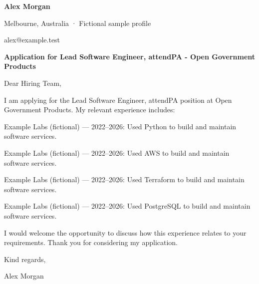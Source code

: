 \documentclass[10pt,a4paper]{article}
\begin{document}
{\LARGE\bfseries\color{navy} Alex Morgan}\par
Melbourne, Australia · Fictional sample profile\par
alex@example.test\par
{\large\bfseries\color{navy} Application for Lead Software Engineer, attendPA - Open Government Products}\par
Dear Hiring Team,\par
I am applying for the Lead Software Engineer, attendPA position at Open Government Products. My relevant experience includes:\par
Example Labs (fictional) — 2022–2026: Used Python to build and maintain software services.\par
Example Labs (fictional) — 2022–2026: Used AWS to build and maintain software services.\par
Example Labs (fictional) — 2022–2026: Used Terraform to build and maintain software services.\par
Example Labs (fictional) — 2022–2026: Used PostgreSQL to build and maintain software services.\par
I would welcome the opportunity to discuss how this experience relates to your requirements. Thank you for considering my application.\par
Kind regards,\par
Alex Morgan\par
\end{document}
